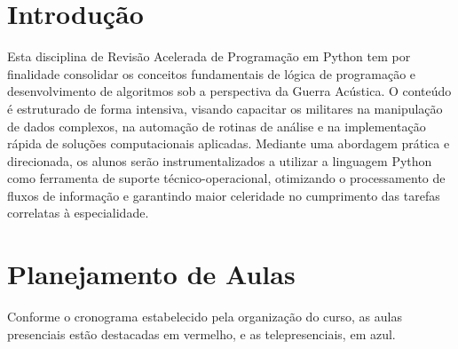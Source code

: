 \section*{Introdução}


Esta disciplina de Revisão Acelerada de Programação em Python tem por finalidade consolidar os conceitos fundamentais de lógica de programação e desenvolvimento de algoritmos sob a perspectiva da Guerra Acústica. O conteúdo é estruturado de forma intensiva, visando capacitar os militares na manipulação de dados complexos, na automação de rotinas de análise e na implementação rápida de soluções computacionais aplicadas. Mediante uma abordagem prática e direcionada, os alunos serão instrumentalizados a utilizar a linguagem Python como ferramenta de suporte técnico-operacional, otimizando o processamento de fluxos de informação e garantindo maior celeridade no cumprimento das tarefas correlatas à especialidade.


\section*{Planejamento de Aulas}

Conforme o cronograma estabelecido pela organização do curso, as aulas presenciais estão destacadas em vermelho, e as telepresenciais, em azul.

